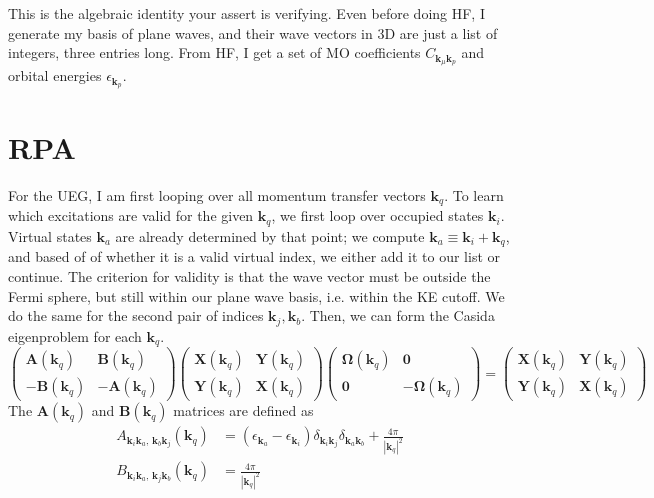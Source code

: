 This is the algebraic identity your assert is verifying.
Even before doing HF, I generate my basis of plane waves, and their wave vectors in 3D are just a list of integers, three entries long. From HF, I get a set of MO coefficients $C_{\bm{k}_\mu \bm{k}_p}$ and orbital energies $\epsilon_{\bm{k}_p}$.
\section{RPA}
For the UEG, I am first looping over all momentum transfer vectors $\bm{k}_q$. To learn which excitations are valid for the given $\bm{k}_q$, we first loop over occupied states $\bm{k}_i$. Virtual states $\bm{k}_a$ are already determined by that point; we compute $\bm{k}_a \equiv \bm{k}_i + \bm{k}_q$, and based of of whether it is a valid virtual index, we either add it to our list or continue. The criterion for validity is that the wave vector must be outside the Fermi sphere, but still within our plane wave basis, i.e. within the KE cutoff. We do the same for the second pair of indices $\bm{k}_j, \bm{k}_b$. Then, we can form the Casida eigenproblem for each $\bm{k}_q$.
\begin{equation}
    \begin{pmatrix}
        \bm{A}(\bm{k}_q) & \bm{B}(\bm{k}_q) \\
        -\bm{B}(\bm{k}_q) & -\bm{A}(\bm{k}_q)
    \end{pmatrix}
    \begin{pmatrix}
        \bm{X}(\bm{k}_q) & \bm{Y}(\bm{k}_q) \\
        \bm{Y}(\bm{k}_q) & \bm{X}(\bm{k}_q)
    \end{pmatrix}
    \begin{pmatrix}
        \bm{\Omega}(\bm{k}_q) & \bm{0} \\
        \bm{0} & -\bm{\Omega}(\bm{k}_q)
    \end{pmatrix}
    = \begin{pmatrix}
        \bm{X}(\bm{k}_q) & \bm{Y}(\bm{k}_q) \\
        \bm{Y}(\bm{k}_q) & \bm{X}(\bm{k}_q)
    \end{pmatrix}
    \label{eqn:casida_eq}
\end{equation}
The $\bm{A}(\bm{k}_q)$ and $\bm{B}(\bm{k}_q)$ matrices are defined as
\begin{align}
    A_{\bm{k}_i \bm{k}_a,\, \bm{k}_b \bm{k}_j }(\bm{k}_q) &= \left(\epsilon_{\bm{k}_a}-\epsilon_{\bm{k}_i}\right) \delta_{\bm{k}_i \bm{k}_j} \delta_{\bm{k}_a \bm{k}_b} + \frac{4\pi}{|\bm{k}_q|^2} \\
    B_{\bm{k}_i \bm{k}_a,\, \bm{k}_j \bm{k}_b}(\bm{k}_q) &= \frac{4\pi}{|\bm{k}_q|^2}
\end{align}
